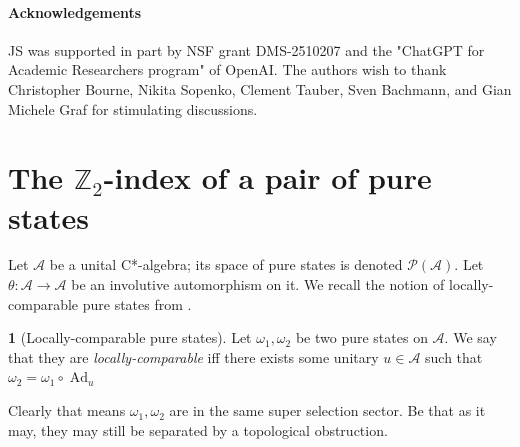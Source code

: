 \documentclass[a4paper,10pt]{article}
\numberwithin{equation}{section}
\theoremstyle{plain}
\theoremstyle{plain}
\theoremstyle{plain}
\theoremstyle{plain}
\theoremstyle{plain}
\theoremstyle{remark}
\theoremstyle{definition}
\newtheorem{defn}[defn]{\protect\definitionname}
\providecommand{\definitionname}{Definition}
\newcommand{\ZZ}{\mathbb{Z}}
\newcommand{\calA}{\mathcal{A}}
\newcommand{\calP}{\mathcal{P}}
\begin{document}
\paragraph{Acknowledgements}
JS was supported in part by NSF grant DMS-2510207 and the "ChatGPT for Academic Researchers program" of OpenAI. The authors wish to thank Christopher Bourne, Nikita Sopenko, Clement Tauber, Sven Bachmann, and Gian Michele Graf for stimulating discussions.

\section{The $\ZZ_2$-index of a pair of pure states}
\label{sec:pair index}
Let $\calA$ be a unital C*-algebra; its space of pure states is denoted $\calP(\calA)$. Let $\theta:\calA\to\calA$ be an involutive automorphism on it. 
We recall the notion of locally-comparable pure states from \cite{BachmannShapiroTauber2026}.
               
\begin{defn}[Locally-comparable pure states]
    Let $\omega_1,\omega_2$ be two pure states on $\calA$. We say that they are \emph{locally-comparable} iff there exists some unitary $u\in\calA$ such that $\omega_2 = \omega_1\circ\operatorname{Ad}_u$
\end{defn}

Clearly that means $\omega_1,\omega_2$ are in the same super selection sector. Be that as it may, they may still be separated by a topological obstruction.
\end{document}
